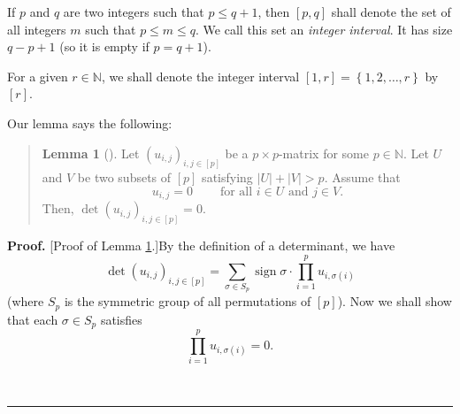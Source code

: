 \documentclass[numbers=enddot,12pt,final,onecolumn,notitlepage]{scrartcl}%
\newenvironment{statement}{\begin{quote}}{\end{quote}}
\theoremstyle{definition}
\newtheorem{lem}[theo]{Lemma}
\newenvironment{lemmain}[1][]
{\begin{statement}\begin{lem}[#1]}
{\end{lem}\end{statement}}
\newenvironment{proof}[1][Proof]{\noindent\textbf{#1.} }{\ \rule{0.5em}{0.5em}}
\newenvironment{lemmain}[1][Proof]{\noindent\textbf{#1.} }{\ \rule{0.5em}{0.5em}}
\let\sumnonlimits\sum
\let\prodnonlimits\prod
\renewcommand{\sum}{\sumnonlimits\limits}
\renewcommand{\prod}{\prodnonlimits\limits}
\begin{document}
\begin{enumerate}
If $p$ and $q$ are two integers such that $p\leq q+1$, then $\left[
p,q\right]  $ shall denote the set of all integers $m$ such that $p\leq m\leq
q$. We call this set an \emph{integer interval}. It has size $q-p+1$ (so it is
empty if $p=q+1$).

For a given $r\in\mathbb{N}$, we shall denote the integer interval $\left[
1,r\right]  =\left\{  1,2,\ldots,r\right\}  $ by $\left[  r\right]  $.

Our lemma says the following:

\begin{lemmain}
\label{lem.A7}Let $\left(  u_{i,j}\right)  _{i,j\in\left[  p\right]  }$ be a
$p\times p$-matrix for some $p\in\mathbb{N}$. Let $U$ and $V$ be two subsets
of $\left[  p\right]  $ satisfying $\left\vert U\right\vert +\left\vert
V\right\vert >p$. Assume that%
\begin{equation}
u_{i,j}=0\ \ \ \ \ \ \ \ \ \ \text{for all }i\in U\text{ and }j\in V.
\label{p18.lemA7.ass}%
\end{equation}
Then, $\det\left(  u_{i,j}\right)  _{i,j\in\left[  p\right]  }=0$.
\end{lemmain}

\begin{proof}
[Proof of Lemma \ref{lem.A7}.]By the definition of a determinant, we have
\begin{equation}
\det\left(  u_{i,j}\right)  _{i,j\in\left[  p\right]  }=\sum_{\sigma\in S_{p}%
}\operatorname*{sign}\sigma\cdot\prod_{i=1}^{p}u_{i,\sigma\left(  i\right)  }
\label{p18.lemA7.pf.0}%
\end{equation}
(where $S_{p}$ is the symmetric group of all permutations of $\left[
p\right]  $). Now we shall show that each $\sigma\in S_{p}$ satisfies%
\begin{equation}
\prod_{i=1}^{p}u_{i,\sigma\left(  i\right)  }=0. \label{p18.lemA7.pf.1}%
\end{equation}



\end{proof}
\end{enumerate}
\end{document}
